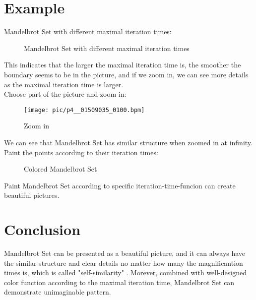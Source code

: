 \documentclass{ctexart}
\begin{document}
\section{Example}

Mandelbrot Set with different maximal iteration times:

\begin{figure}[htbp]
\centering
{}
\quad
{}
\quad
{}
\caption{Mandelbrot Set with different maximal iteration times}
\end{figure}

This indicates that the larger the maximal iteration time is, the smoother the boundary seems to be in the picture, and if we zoom in, we can see more details as the maximal iteration time is larger.\\
Choose part of the picture and zoom in:

\vspace{-1.8cm}
\begin{figure}[htbp]
  \centering
  \texttt{[image: pic/p4\_\_01509035\_0100.bpm]} \label{4}
  \caption{Zoom in}
\end{figure}

We can see that Mandelbrot Set has similar structure when zoomed in at infinity.\\
Paint the points according to their iteration times:

\begin{figure}[htbp]
\centering
{}
\quad
{}
\caption{Colored Mandelbrot Set}
\end{figure}

Paint Mandelbrot Set according to specific iteration-time-funcion can create beautiful pictures.

\section{Conclusion}
Mandelbrot Set can be presented as a beautiful picture, and it can always have the similar structure and clear details no matter how many the magnificantion times is, which is called "self-similarity" \cite{H41}.
Morever, combined with well-designed color function according to the maximal iteration time, Mandelbrot Set can demonstrate unimaginable pattern.



\end{document}
